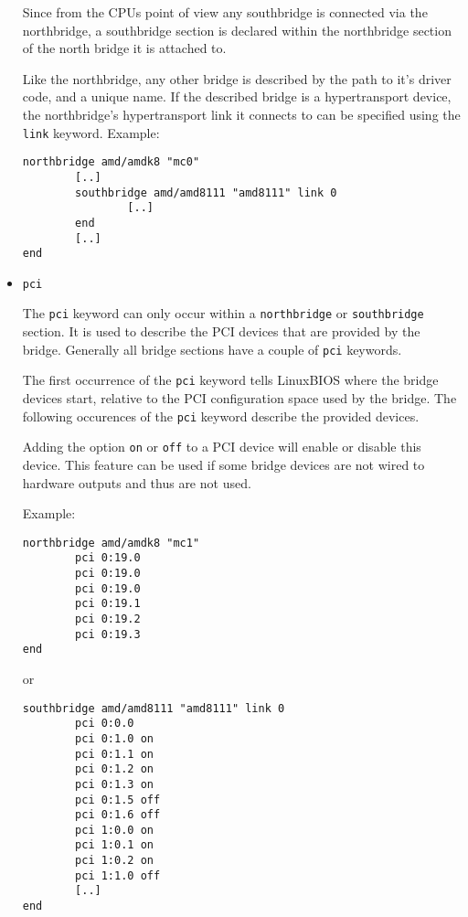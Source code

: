 \documentclass[titlepage,12pt]{article}
\begin{document}
\begin{itemize}
Since from the CPUs point of view any southbridge is connected via the
northbridge, a southbridge section is declared within the northbridge
section of the north bridge it is attached to.

Like the northbridge, any other bridge is described by the path to it's
driver code, and a unique name. If the described bridge is a
hypertransport device, the northbridge's hypertransport link it connects
to can be specified using the \texttt{link} keyword. Example:

\begin{verbatim}
northbridge amd/amdk8 "mc0"
        [..]
        southbridge amd/amd8111 "amd8111" link 0
                [..]
        end
        [..]
end
\end{verbatim}

\item \begin{verbatim}pci\end{verbatim}

The \texttt{pci} keyword can only occur within a \texttt{northbridge} or
\texttt{southbridge} section. It is used to describe the PCI devices
that are provided by the bridge.  Generally all bridge sections have a
couple of \texttt{pci} keywords.

The first occurrence of the \texttt{pci} keyword tells LinuxBIOS where
the bridge devices start, relative to the PCI configuration space used
by the bridge. The following occurences of the \texttt{pci} keyword
describe the provided devices. 

Adding the option \texttt{on} or \texttt{off} to a PCI device will
enable or disable this device. This feature can be used if some bridge
devices are not wired to hardware outputs and thus are not used.

Example:

\begin{verbatim}
northbridge amd/amdk8 "mc1"
        pci 0:19.0
        pci 0:19.0
        pci 0:19.0
        pci 0:19.1
        pci 0:19.2
        pci 0:19.3
end
\end{verbatim}

or

\begin{verbatim}
southbridge amd/amd8111 "amd8111" link 0
        pci 0:0.0
        pci 0:1.0 on
        pci 0:1.1 on
        pci 0:1.2 on
        pci 0:1.3 on
        pci 0:1.5 off
        pci 0:1.6 off
        pci 1:0.0 on
        pci 1:0.1 on
        pci 1:0.2 on
        pci 1:1.0 off
        [..]
end
\end{verbatim}


\end{itemize}
\end{document}
